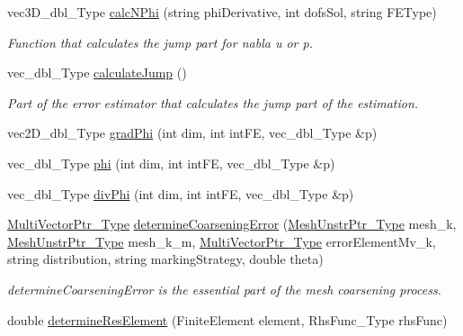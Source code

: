 \begin{DoxyCompactItemize}
vec3\+D\+\_\+dbl\+\_\+\+Type \hyperlink{classFEDD_1_1ErrorEstimation_afcf7a4f48e9b1b16b9970d01e3c99fb1}{calc\+N\+Phi} (string phi\+Derivative, int dofs\+Sol, string F\+E\+Type)
\begin{DoxyCompactList}\small\item\em Function that calculates the jump part for nabla u or p. \end{DoxyCompactList}\item 
vec\+\_\+dbl\+\_\+\+Type \hyperlink{classFEDD_1_1ErrorEstimation_a2d5d3da2a6589350e8c158363d876cdc}{calculate\+Jump} ()
\begin{DoxyCompactList}\small\item\em Part of the error estimator that calculates the jump part of the estimation. \end{DoxyCompactList}\item 
vec2\+D\+\_\+dbl\+\_\+\+Type \hyperlink{classFEDD_1_1ErrorEstimation_a74e71e6f93d83fba059694630b01fc49}{grad\+Phi} (int dim, int int\+FE, vec\+\_\+dbl\+\_\+\+Type \&p)
\item 
vec\+\_\+dbl\+\_\+\+Type \hyperlink{classFEDD_1_1ErrorEstimation_a54af187cc5c349977b9881507f2c7067}{phi} (int dim, int int\+FE, vec\+\_\+dbl\+\_\+\+Type \&p)
\item 
vec\+\_\+dbl\+\_\+\+Type \hyperlink{classFEDD_1_1ErrorEstimation_ab431f17922373048aa647619e608cb52}{div\+Phi} (int dim, int int\+FE, vec\+\_\+dbl\+\_\+\+Type \&p)
\item 
\hyperlink{classFEDD_1_1ErrorEstimation_a5882ff373bf8c409b407b4fd1f42bda0}{Multi\+Vector\+Ptr\+\_\+\+Type} \hyperlink{classFEDD_1_1ErrorEstimation_aaea42bb86ba14cf0adeba6b28ed8f4c0}{determine\+Coarsening\+Error} (\hyperlink{classFEDD_1_1ErrorEstimation_a862043dc355a1524640b5ef53e8eefa1}{Mesh\+Unstr\+Ptr\+\_\+\+Type} mesh\+\_\+k, \hyperlink{classFEDD_1_1ErrorEstimation_a862043dc355a1524640b5ef53e8eefa1}{Mesh\+Unstr\+Ptr\+\_\+\+Type} mesh\+\_\+k\+\_\+m, \hyperlink{classFEDD_1_1ErrorEstimation_a5882ff373bf8c409b407b4fd1f42bda0}{Multi\+Vector\+Ptr\+\_\+\+Type} error\+Element\+Mv\+\_\+k, string distribution, string marking\+Strategy, double theta)
\begin{DoxyCompactList}\small\item\em determine\+Coarsening\+Error is the essential part of the mesh coarsening process. \end{DoxyCompactList}\item 
double \hyperlink{classFEDD_1_1ErrorEstimation_ac709ef81edfeb0d91b175ea480570fd2}{determine\+Res\+Element} (Finite\+Element element, Rhs\+Func\+\_\+\+Type rhs\+Func)

\end{DoxyCompactItemize}
